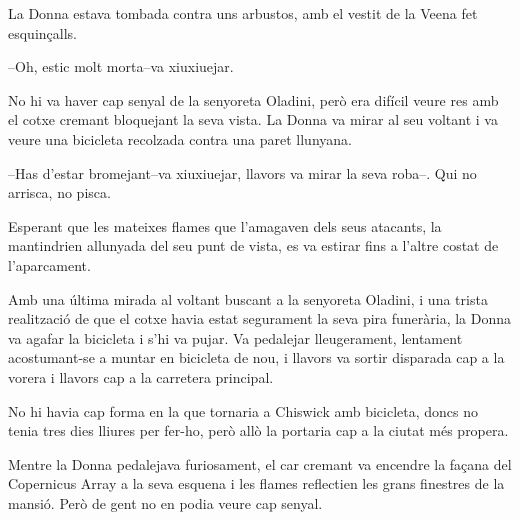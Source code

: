 La Donna estava tombada contra uns arbustos, amb el vestit de la Veena
fet esquinçalls.

--Oh, estic molt morta--va xiuxiuejar.

No hi va haver cap senyal de la senyoreta Oladini, però era difícil
veure res amb el cotxe cremant bloquejant la seva vista. La Donna va
mirar al seu voltant i va veure una bicicleta recolzada contra una paret
llunyana.

--Has d'estar bromejant--va xiuxiuejar, llavors va mirar la seva roba--.
Qui no arrisca, no pisca.

Esperant que les mateixes flames que l'amagaven dels seus atacants, la
mantindrien allunyada del seu punt de vista, es va estirar fins a
l'altre costat de l'aparcament.

Amb una última mirada al voltant buscant a la senyoreta Oladini, i una
trista realització de que el cotxe havia estat segurament la seva pira
funerària, la Donna va agafar la bicicleta i s'hi va pujar. Va pedalejar
lleugerament, lentament acostumant-se a muntar en bicicleta de nou, i
llavors va sortir disparada cap a la vorera i llavors cap a la carretera
principal.

No hi havia cap forma en la que tornaria a Chiswick amb bicicleta, doncs
no tenia tres dies lliures per fer-ho, però allò la portaria cap a la
ciutat més propera.

Mentre la Donna pedalejava furiosament, el car cremant va encendre la
façana del Copernicus Array a la seva esquena i les flames reflectien
les grans finestres de la mansió. Però de gent no en podia veure cap
senyal.